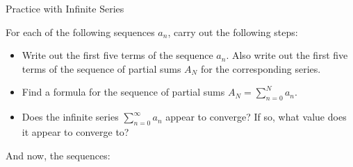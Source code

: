 \begin{exercise}{Practice with Infinite Series \Coffeecup \Coffeecup \Coffeecup}

For each of the following sequences $a_n$, carry out the following steps:

\begin{itemize}

\item Write out the first five terms of the sequence $a_n$.  Also write out the first five terms of the sequence of partial sums $A_N$ for the corresponding series.

\item  Find a formula for the sequence of partial sums $A_N=\sum_{n=0}^N a_n$.

\item Does the infinite series $\sum_{n=0}^\infty a_n$ appear to converge?  If so, what value does it appear to converge to?

\end{itemize}

And now, the sequences:

\begin{itemize}


\end{itemize}
\end{exercise}
